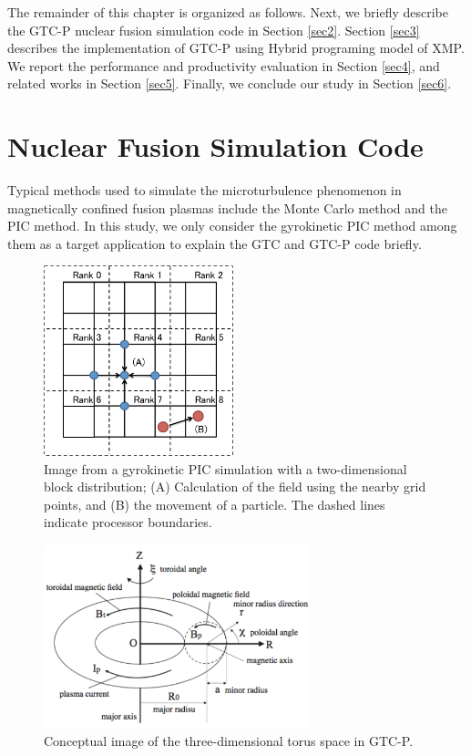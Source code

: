 The remainder of this chapter is organized as follows.
Next, we briefly describe the GTC-P nuclear fusion simulation code in Section \ref{sec2}. Section \ref{sec3} describes the implementation of GTC-P using
Hybrid programing model of XMP. We report the performance and productivity evaluation in Section \ref{sec4}, and related works in Section \ref{sec5}. Finally, we conclude our study in Section \ref{sec6}.


\section{Nuclear Fusion Simulation Code\label{sec2}}
Typical methods used to simulate the microturbulence phenomenon in magnetically confined fusion plasmas include the Monte Carlo method and the PIC method. In this study, we only consider the gyrokinetic PIC method among them as a target application to explain the GTC and GTC-P code briefly.

\begin{figure}[t]
\begin{center}
\includegraphics[width=5.5cm,bb=0 0 341 342]{./figure/picfig.pdf}
\caption{Image from a gyrokinetic PIC simulation with a two-dimensional block distribution; (A) Calculation of the field using the nearby grid points, and (B) the movement of a particle. The dashed lines indicate processor boundaries. }
\label{picfig}
\end{center}
\end{figure}


\begin{figure}[t]
\begin{center}
\includegraphics[width=7.7cm,bb=0 0 482 334]{./figure/torus.pdf}
\caption{Conceptual image of the three-dimensional torus space in GTC-P\cite{NUGA}.}
\label{torus}
\end{center}
\end{figure}

